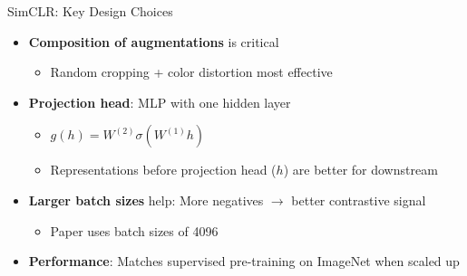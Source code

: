 \documentclass[11pt]{beamer}
\begin{document}
\begin{frame}{SimCLR: Key Design Choices}
    \begin{itemize}
        \item \textbf{Composition of augmentations} is critical
            \begin{itemize}
                \item Random cropping + color distortion most effective
            \end{itemize}
        \item \textbf{Projection head}: MLP with one hidden layer
            \begin{itemize}
                \item $g(h) = W^{(2)} \sigma(W^{(1)} h)$
                \item Representations before projection head ($h$) are better for downstream
            \end{itemize}
        \item \textbf{Larger batch sizes} help: More negatives $\to$ better contrastive signal
            \begin{itemize}
                \item Paper uses batch sizes of 4096
            \end{itemize}
        \item \textbf{Performance}: Matches supervised pre-training on ImageNet when scaled up
    \end{itemize}
\end{frame}
\end{document}
